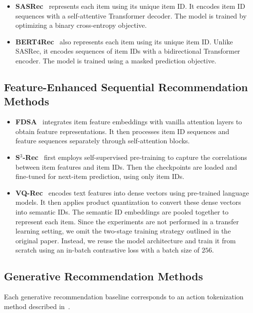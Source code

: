 \begin{itemize}
    \item \textbf{SASRec}~\cite{kang2018sasrec} represents each item using its unique item ID. It encodes item ID sequences with a self-attentive Transformer decoder. The model is trained by optimizing a binary cross-entropy objective.
    \item \textbf{BERT4Rec}~\cite{sun2019bert4rec} also represents each item using its unique item ID. Unlike SASRec, it encodes sequences of item IDs with a bidirectional Transformer encoder. The model is trained using a masked prediction objective.
\end{itemize}

\subsection{Feature-Enhanced Sequential Recommendation Methods}

\begin{itemize}
    \item \textbf{FDSA}~\cite{zhang2019fdsa} integrates item feature embeddings with vanilla attention layers to obtain feature representations. It then processes item ID sequences and feature sequences separately through self-attention blocks.
    \item \textbf{S$^3$-Rec}~\cite{zhou2020s3} first employs self-supervised pre-training to capture the correlations between item features and item IDs. Then the checkpoints are loaded and fine-tuned for next-item prediction, using only item IDs.
    \item \textbf{VQ-Rec}~\cite{hou2023vqrec} encodes text features into dense vectors using pre-trained language models. It then applies product quantization to convert these dense vectors into semantic IDs. The semantic ID embeddings are pooled together to represent each item. Since the experiments are not performed in a transfer learning setting, we omit the two-stage training strategy outlined in the original paper. Instead, we reuse the model architecture and train it from scratch using an in-batch contrastive loss with a batch size of $256$.
\end{itemize}

\subsection{Generative Recommendation Methods}

Each generative recommendation baseline corresponds to an action tokenization method described in~.

